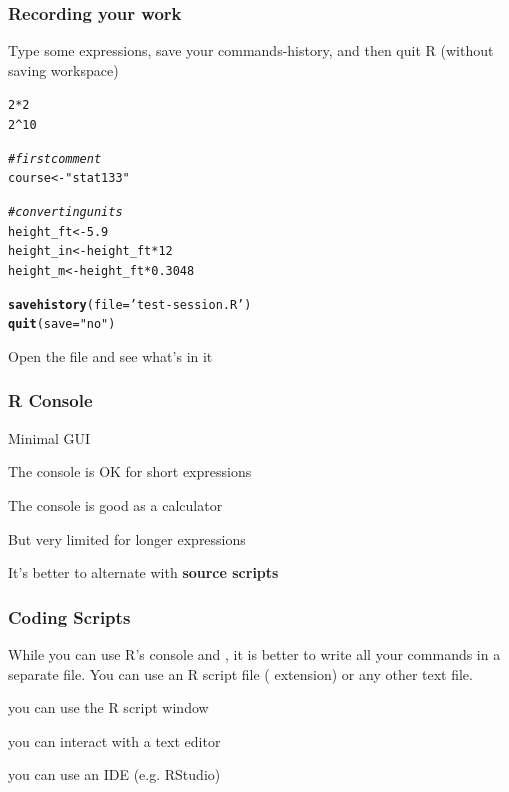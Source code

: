 \documentclass[12pt]{beamer}\usepackage[]{graphicx}\usepackage[]{color}
\makeatletter
\newcommand{\hlnum}[1]{\textcolor[rgb]{0.686,0.059,0.569}{#1}}%
\newcommand{\hlstr}[1]{\textcolor[rgb]{0.192,0.494,0.8}{#1}}%
\newcommand{\hlcom}[1]{\textcolor[rgb]{0.678,0.584,0.686}{\textit{#1}}}%
\newcommand{\hlopt}[1]{\textcolor[rgb]{0,0,0}{#1}}%
\newcommand{\hlstd}[1]{\textcolor[rgb]{0.345,0.345,0.345}{#1}}%
\newcommand{\hlkwb}[1]{\textcolor[rgb]{0.69,0.353,0.396}{#1}}%
\newcommand{\hlkwc}[1]{\textcolor[rgb]{0.333,0.667,0.333}{#1}}%
\newcommand{\hlkwd}[1]{\textcolor[rgb]{0.737,0.353,0.396}{\textbf{#1}}}%
\newenvironment{kframe}{%
 \def\at@end@of@kframe{}%
 \ifinner\ifhmode%
  \def\at@end@of@kframe{\end{minipage}}%
  \begin{minipage}{\columnwidth}%
 \fi\fi%
 \def\FrameCommand##1{\hskip\@totalleftmargin \hskip-\fboxsep
 \colorbox{shadecolor}{##1}\hskip-\fboxsep
     \hskip-\linewidth \hskip-\@totalleftmargin \hskip\columnwidth}%
 \MakeFramed {\advance\hsize-\width
   \@totalleftmargin\z@ \linewidth\hsize
   \@setminipage}}%
 {\par\unskip\endMakeFramed%
 \at@end@of@kframe}
\newenvironment{knitrout}{}{} %
\makeatother
\begin{document}

\begin{frame}[fragile]
\frametitle{Recording your work}

Type some expressions, save your commands-history, and then quit R (without saving workspace)
\begin{knitrout}\footnotesize
{}\color{fgcolor}\begin{kframe}
\begin{alltt}
\hlnum{2} \hlopt{*} \hlnum{2}
\hlnum{2}\hlopt{^}\hlnum{10}

\hlcom{# first comment}
\hlstd{course} \hlkwb{<-} \hlstr{"stat133"}

\hlcom{# converting units}
\hlstd{height_ft} \hlkwb{<-} \hlnum{5.9}
\hlstd{height_in} \hlkwb{<-} \hlstd{height_ft} \hlopt{*} \hlnum{12}
\hlstd{height_m} \hlkwb{<-} \hlstd{height_ft} \hlopt{*} \hlnum{0.3048}

\hlkwd{savehistory}\hlstd{(}\hlkwc{file} \hlstd{=} \hlstr{'test-session.R'}\hlstd{)}
\hlkwd{quit}\hlstd{(}\hlkwc{save} \hlstd{=} \hlstr{"no"}\hlstd{)}
\end{alltt}
\end{kframe}
\end{knitrout}

{\lit Open the file  and see what's in it}

\end{frame}


\begin{frame}
\frametitle{R Console}

\bi
  \item Minimal GUI
  \item The console is OK for short expressions
  \item The console is good as a calculator
  \item But very limited for longer expressions
  \item It's better to alternate with \textbf{source scripts}
\ei

\end{frame}


\begin{frame}
\frametitle{Coding Scripts}

While you can use R's console and , it is better to write all your commands in a separate file. You can use an {\hilit R script} file ( extension) or any other text file.
\eb

\bi
  \item you can use the R script window
  \item you can interact with a text editor
  \item you can use an IDE (e.g. RStudio)
\ei

\end{frame}
\end{document}
